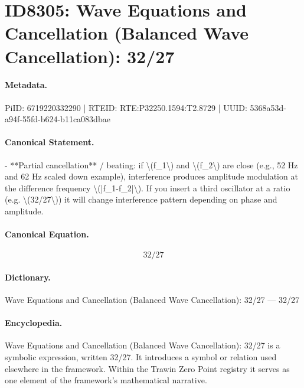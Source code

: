 \section*{ID8305: Wave Equations and Cancellation (Balanced Wave Cancellation): 32/27}
\paragraph{Metadata.}
PiID: 6719220332290 | RTEID: RTE:P32250.1594:T2.8729 | UUID: 5368a53d-a94f-55fd-b624-b11ca083dbae

\paragraph{Canonical Statement.}
- **Partial cancellation** / beating: if \textbackslash{}(f\_1\textbackslash{}) and \textbackslash{}(f\_2\textbackslash{}) are close (e.g., 52 Hz and 62 Hz scaled down example), interference produces amplitude modulation at the difference frequency \textbackslash{}(|f\_1-f\_2|\textbackslash{}). If you insert a third oscillator at a ratio (e.g. \textbackslash{}(32/27\textbackslash{})) it will change interference pattern depending on phase and amplitude.

\paragraph{Canonical Equation.}
\[
32/27
\]

\paragraph{Dictionary.}
Wave Equations and Cancellation (Balanced Wave Cancellation): 32/27 — 32/27

\paragraph{Encyclopedia.}
Wave Equations and Cancellation (Balanced Wave Cancellation): 32/27 is a symbolic expression, written 32/27. It introduces a symbol or relation used elsewhere in the framework. Within the Trawin Zero Point registry it serves as one element of the framework's mathematical narrative.
